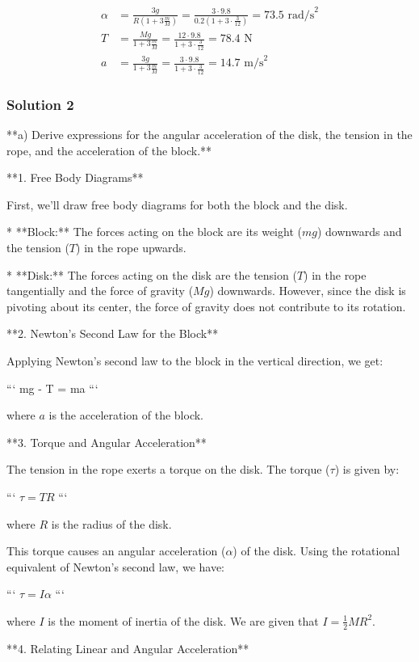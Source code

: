 \documentclass{article}
\begin{document}
\begin{align*}
\alpha &= \frac{3g}{R(1+3\frac{m}{M})} = \frac{3 \cdot 9.8}{0.2 (1+3\cdot \frac{3}{12})} = 73.5 \text{ rad/s}^2 \\
T &= \frac{Mg}{1+3\frac{m}{M}} = \frac{12 \cdot 9.8}{1 + 3 \cdot \frac{3}{12}} = 78.4 \text{ N} \\
a &= \frac{3g}{1+3\frac{m}{M}} = \frac{3 \cdot 9.8}{1+3\cdot \frac{3}{12}} = 14.7 \text{ m/s}^2
\end{align*} 


\subsubsection{Solution 2}
**a) Derive expressions for the angular acceleration of the disk, the tension in the rope, and the acceleration of the block.**

**1. Free Body Diagrams**

First, we'll draw free body diagrams for both the block and the disk.

* **Block:** The forces acting on the block are its weight ($mg$) downwards and the tension ($T$) in the rope upwards.

* **Disk:** The forces acting on the disk are the tension ($T$) in the rope tangentially and the force of gravity ($Mg$) downwards. However, since the disk is pivoting about its center, the force of gravity does not contribute to its rotation.

**2. Newton's Second Law for the Block**

Applying Newton's second law to the block in the vertical direction, we get:

```
mg - T = ma
```

where $a$ is the acceleration of the block.

**3. Torque and Angular Acceleration**

The tension in the rope exerts a torque on the disk. The torque ($\tau$) is given by:

```
$\tau = TR$
```

where $R$ is the radius of the disk.

This torque causes an angular acceleration ($\alpha$) of the disk. Using the rotational equivalent of Newton's second law, we have:

```
$\tau = I \alpha$
```

where $I$ is the moment of inertia of the disk.  We are given that $I = \frac{1}{2}MR^2$.

**4. Relating Linear and Angular Acceleration**
\end{document}
